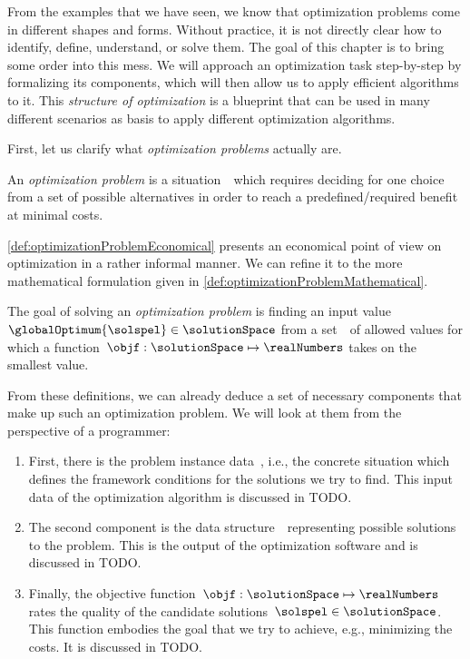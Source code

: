%
\label{sec:structure:intro}%
%
From the examples that we have seen, we know that optimization problems come in different shapes and forms.
Without practice, it is not directly clear how to identify, define, understand, or solve them.
The goal of this chapter is to bring some order into this mess.
We will approach an optimization task step-by-step by formalizing its components, which will then allow us to apply efficient algorithms to it.
This \emph{structure of optimization} is a blueprint that can be used in many different scenarios as basis to apply different optimization algorithms.

First, let us clarify what \emph{optimization problems} actually are.%
%
\begin{definition}%
\label{def:optimizationProblemEconomical}%
An \emph{optimization problem} is a situation~\instance\ which requires deciding for one choice from a set of possible alternatives in order to reach a predefined/required benefit at minimal costs.%
\end{definition}%
%
\autoref{def:optimizationProblemEconomical} presents an economical point of view on optimization in a rather informal manner.
We can refine it to the more mathematical formulation given in \autoref{def:optimizationProblemMathematical}.%
%
\begin{definition}%
\label{def:optimizationProblemMathematical}%
The goal of solving an \emph{optimization problem} is finding an input value~$\globalOptimum{\solspel}\in\solutionSpace$ from a set~\solutionSpace\ of allowed values for which a function~$\objf:\solutionSpace\mapsto\realNumbers$ takes on the smallest value.%
\end{definition}%
%
From these definitions, we can already deduce a set of necessary components that make up such an optimization problem.
We will look at them from the perspective of a programmer:%
%
\begin{enumerate}%
%
\item First, there is the problem instance data~\instance, i.e., the concrete situation which defines the framework conditions for the solutions we try to find.
This input data of the optimization algorithm is discussed in TODO.%
%
\item The second component is the data structure~\solutionSpace\ representing possible solutions to the problem.
This is the output of the optimization software and is discussed in TODO.%
%
\item Finally, the objective function~$\objf:\solutionSpace\mapsto\realNumbers$ rates the quality of the candidate solutions~$\solspel\in\solutionSpace$.
This function embodies the goal that we try to achieve, e.g., minimizing the costs.
It is discussed in TODO.%
%
\end{enumerate}%
